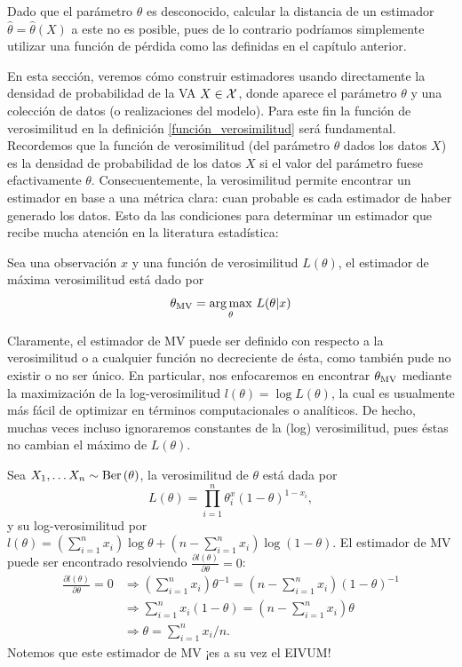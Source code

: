 Dado que el parámetro $\theta$ es desconocido, calcular la distancia de un estimador $\hat\theta = \hat\theta(X)$ a este no es posible, pues de lo contrario  podríamos simplemente utilizar una función de pérdida como las definidas en el capítulo anterior.

En esta sección, veremos cómo construir estimadores usando directamente la densidad de probabilidad de la VA $X\in{\mathcal X}$, donde aparece el parámetro $\theta$ y una colección de datos (o realizaciones del modelo). Para este fin la función de verosimilitud en la definición \ref{función_verosimilitud} será fundamental. Recordemos que la función de verosimilitud (del parámetro $\theta$ dados los datos $X$) es la densidad de probabilidad de los datos $X$ si el valor del parámetro fuese efactivamente $\theta$. Consecuentemente, la verosimilitud permite encontrar un estimador en base a una métrica clara: cuan probable es cada estimador de haber generado los datos. Esto da las condiciones para determinar un estimador que recibe mucha atención en la literatura estadística: 

\begin{definition}
	Sea una observación $x$ y una función de verosimilitud $L(\theta)$, el estimador de máxima verosimilitud está dado por 
	\begin{equation}
		\thetaMV = \underset{\theta}{\arg\max}\ L(\theta|x)
	\end{equation}	
\end{definition}

Claramente, el estimador de MV puede ser definido con respecto a la verosimilitud o a cualquier función no decreciente de ésta, como también pude no existir o no ser único. En particular, nos enfocaremos en encontrar ${\theta_\text{MV}}$ mediante la maximización de la log-verosimilitud $l(\theta) = \log L(\theta)$, la cual es usualmente más fácil de optimizar en términos computacionales o analíticos. De hecho, muchas veces incluso ignoraremos constantes de la (log) verosimilitud, pues éstas no cambian el máximo de $L(\theta)$.

\begin{example}
	\label{ex:bernoulli_MV}
	Sea $X_1,\ldots X_n\sim\text{Ber}\left(\theta\right)$, la verosimilitud de $\theta$ está dada por 
	\begin{equation}
		L(\theta) = \prod_{i=1}^n\theta^x_i(1-\theta)^{1-x_i},
	\end{equation}
	y su log-verosimilitud por $l(\theta) = (\sum_{i=1}^nx_i)\log \theta + (n-\sum_{i=1}^nx_i)\log(1-\theta)$. El estimador de  MV puede ser encontrado resolviendo $\frac{\partial l(\theta)}{\partial \theta} = 0$:
	\begin{align*}
	\frac{\partial l(\theta)}{\partial \theta} =0 
	&\Rightarrow  (\sum_{i=1}^nx_i) \theta^{-1} = (n-\sum_{i=1}^nx_i)(1-\theta)^{-1}\\
	&\Rightarrow  \sum_{i=1}^nx_i (1-\theta) = (n-\sum_{i=1}^nx_i) \theta\\
	&\Rightarrow  \theta = \sum_{i=1}^nx_i/n.
	\end{align*}
Notemos que este estimador de MV ¡es a su vez el EIVUM!	
\end{example}


